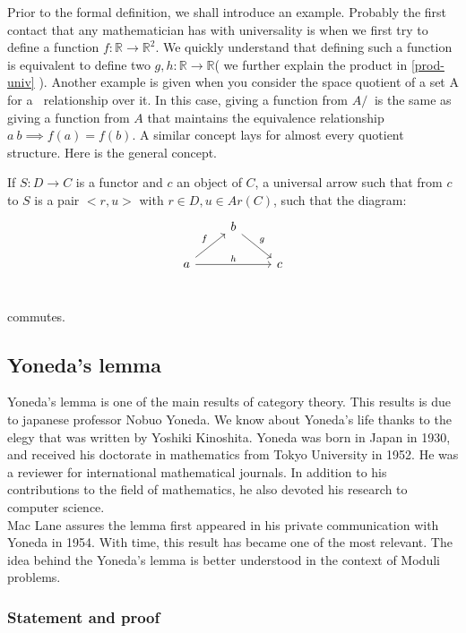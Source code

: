 Prior to the formal definition, we shall introduce an example. Probably the first contact that any mathematician has with universality is when we first try to define a function  $f:\mathbb R \to \mathbb R^2$. We quickly understand that defining such a function is equivalent to define two $g,h: \mathbb R \to \mathbb R$( we further explain the product in \ref{prod-univ} ). Another example is given when you consider the space quotient of a set A for a $~$ relationship over it. In this case, giving a function from $A/~$ is the same as giving a function from $A$ that maintains the equivalence relationship $a~b \implies f(a)=f(b)$. A similar concept lays for almost every quotient structure. Here is the general concept.

\begin{definition}
  If $S: D \to C$ is a functor and $c$ an object of $C$, a universal arrow such that from $c$ to $S$ is a pair $<r,u>$ with $r\in D, u \in Ar(C)$, such that the diagram:
  \[
    \begin{tikzcd}
      & b \arrow[rd, "g"]& \\
      a\arrow[ru, "f"] \arrow[rr, "h"] && c\\
    \end{tikzcd}
  \]

  commutes. 
\end{definition}

\subsection{Yoneda's lemma}
Yoneda's lemma is one of the main results of category theory. This results is due to japanese professor Nobuo Yoneda. We know about Yoneda's life thanks to the elegy that was written by Yoshiki Kinoshita\cite{yonedaLife}. Yoneda was born in Japan in 1930, and received his doctorate in mathematics from Tokyo University in 1952. He was a reviewer for international mathematical journals. In addition to his contributions to the field of mathematics, he also devoted his research to computer science.\\

Mac Lane\cite{mac2013categories} assures the lemma first appeared in his private communication with Yoneda in 1954. With time, this result has became one of the most relevant. The idea behind the Yoneda's lemma is better understood in the context of Moduli problems. 

\subsubsection{Statement and proof}

